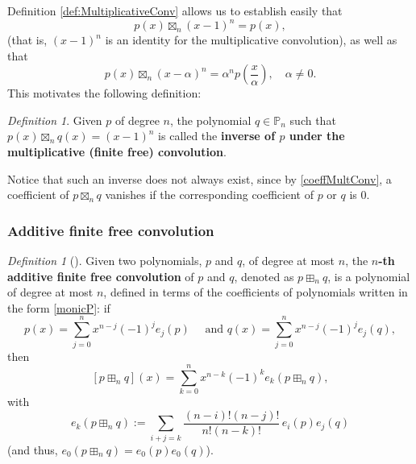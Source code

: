 \documentclass[reqno,11pt]{amsart}
\theoremstyle{remark}
\newtheorem{definition}[theorem]{Definition}
\begin{document}
Definition \ref{def:MultiplicativeConv} allows us to establish easily that 
    \begin{equation}
        \label{identityMult1}
        p(x) \boxtimes_n (x-1)^n = p(x),
    \end{equation}
(that is, $(x-1)^n$ is an identity for the multiplicative convolution), as well as that
\begin{equation}
    \label{identityMult2}
    p(x) \boxtimes_n (x-\alpha)^n = \alpha^n p\left(\frac{x}{\alpha}\right), \quad \alpha\neq 0.
\end{equation}
This motivates the following definition:
\begin{definition} \label{def:multInverse}
Given $p  $ of degree $n$, the polynomial $q\in \mathbb P_n$ such that $p(x)\boxtimes_n q(x)=(x-1)^n$ is called the \textbf{inverse of $p$ under the multiplicative (finite free) convolution}.
\end{definition}
Notice that such an inverse does not always exist, since by \eqref{coeffMultConv}, a coefficient of $p\boxtimes_n q$ vanishes if the corresponding coefficient of $p$ or $q$ is $0$. 


\subsubsection{Additive finite free convolution}

\begin{definition}[\cite{MR4408504}]
Given two polynomials, $p$ and $q$, of degree at most $n$, the \textbf{$n$-th additive finite free convolution} of $p$ and $q$, denoted as $p\boxplus_n q$, is a polynomial of degree at most $n$, defined in terms of the coefficients of polynomials written in the form \eqref{monicP}: if
\begin{equation}
    \label{defFADDCONV}
    p(x)=\sum_{j=0}^n x^{n-j}(-1)^j e_j(p) \quad \text { and } q(x)=\sum_{j=0}^n x^{n-j}(-1)^j e_j(q),
\end{equation}
then
$$
[p\boxplus_n q](x) = \sum_{k=0}^n x^{n-k}(-1)^k e_k(p\boxplus_n q),
$$
with
\begin{equation}
    \label{coeffAdditiveConv}
e_k(p\boxplus_n q) :=  \sum_{i+j=k} \frac{(n-i) !(n-j) !}{n !(n-k) !} \, e_i(p) e_j(q)
\end{equation}
(and thus, $e_0(p\boxplus_n q)=e_0(p)e_0(  q)$).
\end{definition}
 
\end{document}
